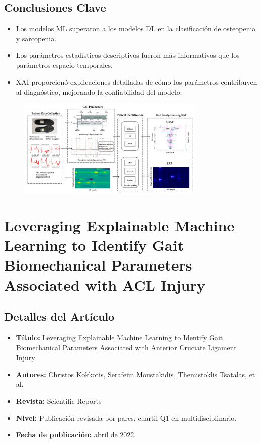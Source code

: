 \documentclass{report}
\begin{document}
\subsection{Conclusiones Clave}
\begin{itemize}
    \item Los modelos ML superaron a los modelos DL en la clasificación de osteopenia y sarcopenia.
    \item Los parámetros estadísticos descriptivos fueron más informativos que los parámetros espacio-temporales.
    \item XAI proporcionó explicaciones detalladas de cómo los parámetros contribuyen al diagnóstico, mejorando la confiabilidad del modelo.
\end{itemize}

\begin{figure}[H] 
    \centering
    \includegraphics[width=0.8\textwidth]{Images/Kim2022.jpg}
\end{figure}


\section{Leveraging Explainable Machine Learning to Identify Gait Biomechanical Parameters Associated with ACL Injury}

\subsection{Detalles del Artículo}
\begin{itemize}
    \item \textbf{Título:} Leveraging Explainable Machine Learning to Identify Gait Biomechanical Parameters Associated with Anterior Cruciate Ligament Injury
    \item \textbf{Autores:} Christos Kokkotis, Serafeim Moustakidis, Themistoklis Tsatalas, et al.
    \item \textbf{Revista:} Scientific Reports
    \item \textbf{Nivel:} Publicación revisada por pares, cuartil Q1 en multidisciplinario.
    \item \textbf{Fecha de publicación:} abril de 2022.
\end{itemize}
\end{document}
